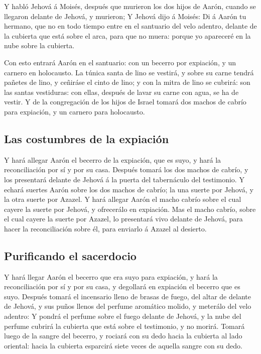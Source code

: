  Y habló Jehová á Moisés, después que murieron los dos hijos
de Aarón, cuando se llegaron delante de Jehová, y murieron; 
Y Jehová dijo á Moisés: Di á Aarón tu hermano, que no en todo tiempo
entre en el santuario del velo adentro, delante de la cubierta que está
sobre el arca, para que no muera: porque yo apareceré en la nube sobre
la cubierta.

 Con esto entrará Aarón en el santuario: con un becerro por
expiación, y un carnero en holocausto.  La túnica santa de
lino se vestirá, y sobre su carne tendrá pañetes de lino, y ceñiráse el
cinto de lino; y con la mitra de lino se cubrirá: son las santas
vestiduras: con ellas, después de lavar su carne con agua, se ha de
vestir.  Y de la congregación de los hijos de Israel tomará
dos machos de cabrío para expiación, y un carnero para holocausto.

\hypertarget{las-costumbres-de-la-expiaciuxf3n}{%
\subsection{Las costumbres de la
expiación}\label{las-costumbres-de-la-expiaciuxf3n}}

 Y hará allegar Aarón el becerro de la expiación, que es
suyo, y hará la reconciliación por sí y por su casa. 
Después tomará los dos machos de cabrío, y los presentará delante de
Jehová á la puerta del tabernáculo del testimonio.  Y echará
suertes Aarón sobre los dos machos de cabrío; la una suerte por Jehová,
y la otra suerte por Azazel.  Y hará allegar Aarón el macho
cabrío sobre el cual cayere la suerte por Jehová, y ofrecerálo en
expiación.  Mas el macho cabrío, sobre el cual cayere la
suerte por Azazel, lo presentará vivo delante de Jehová, para hacer la
reconciliación sobre él, para enviarlo á Azazel al desierto.

\hypertarget{purificando-el-sacerdocio}{%
\subsection{Purificando el sacerdocio}\label{purificando-el-sacerdocio}}

 Y hará llegar Aarón el becerro que era suyo para
expiación, y hará la reconciliación por sí y por su casa, y degollará en
expiación el becerro que es suyo.  Después tomará el
incensario lleno de brasas de fuego, del altar de delante de Jehová, y
sus puños llenos del perfume aromático molido, y meterálo del velo
adentro:  Y pondrá el perfume sobre el fuego delante de
Jehová, y la nube del perfume cubrirá la cubierta que está sobre el
testimonio, y no morirá.  Tomará luego de la sangre del
becerro, y rociará con su dedo hacia la cubierta al lado oriental: hacia
la cubierta esparcirá siete veces de aquella sangre con su dedo.

